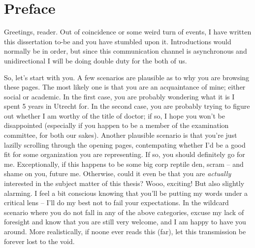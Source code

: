 {
\renewcommand{\thechapter}{\arabic{chapter}}
\setcounter{chapter}{-1}
\renewcommand{\bibname}{Papers this dissertation is based on}
\chapter{Preface}
\label{chapter:preface}


Greetings, reader. Out of coincidence or some weird turn of events, I have written this dissertation to-be and you have stumbled upon it.
Introductions would normally be in order, but since this communication channel is asynchronous and unidirectional I will be doing double duty for the both of us.

So, let's start with you. 
A few scenarios are plausible as to why you are browsing these pages. 
The most likely one is that you are an acquaintance of mine; either social or academic.
In the first case, you are probably wondering what it is I spent 5 years in Utrecht for.
In the second case, you are probably trying to figure out whether I am worthy of the title of doctor; if so, I hope you won’t be disappointed (especially if you happen to be a member of the examination committee, for both our sakes).
Another plausible scenario is that you're just lazilly scrolling through the opening pages, contempating whether I'd be a good fit for some organization you are representing.
If so, you should definitely go for me.
Exceptionally, if this happens to be some big corp reptile den, scram -- and shame on you, future me.
Otherwise, could it even be that you are \textit{actually} interested in the subject matter of this thesis? 
Wooo, exciting!
But also slightly alarming.
I feel a bit conscious knowing that you'll be putting my words under a critical lens – I’ll do my best not to fail your expectations. 
In the wildcard scenario where you do not fall in any of the above categories, excuse my lack of foresight and know that you are still very welcome, and I am happy to have you around.
More realistically, if noone ever reads this (far), let this transmission be forever lost to the void.

}

